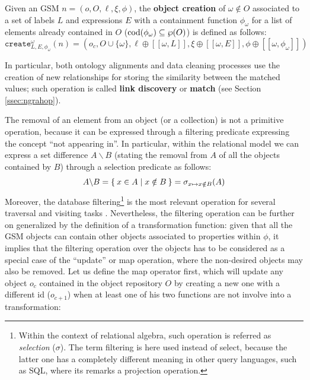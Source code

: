 \begin{definition}\label{gsql:objcreate}
	Given an GSM $n=(o,O,\ell,\xi,\phi)$,  the \textbf{object creation} of $\omega\notin O$ associated to a set of labels $L$ and expressions $E$ with a containment function $\phi_\omega$ for a list of elements already contained in $O$ ($\operatorname{cod}(\phi_\omega)\subseteq \wp(O)$) is defined as follows:
	\[\texttt{create}^\omega_{L,E,\phi_\omega}(n)=(o_c,O\cup\{\omega\},\ell\oplus[[\omega, L]],\xi\oplus[[\omega, E]],\phi\oplus[[\omega,\phi_\omega]])\]
\end{definition}

 In particular, both ontology alignments and data cleaning processes \cite{ALIEH17} use the creation of new relationships for storing the similarity between the matched values; such operation is called \textbf{link discovery} or \textbf{match} (see Section \vref{ssec:ngrahop}).

The removal of an element from an object (or a collection) is not a primitive operation, because it can be expressed through a filtering predicate expressing the concept ``not appearing in''. In particular, within the relational model we can express a set difference $A\backslash B$ (stating the removal from $A$ of all the objects contained by $B$) through a selection predicate as follows:
\begin{equation}\label{eq:difference}
A\backslash B = \Set{x\in A | x\notin B}=\sigma_{x\mapsto x\notin B}(A)
\end{equation}
Moreover, the  database filtering\footnote{Within the context of relational algebra, such operation is referred as \textit{selection} ($\sigma$). The term filtering is here used instead of select, because the latter one has a completely different meaning in other query languages, such as SQL, where its remarks a projection operation.} is the most relevant operation for several traversal and visiting tasks \cite{ThakkarPAV17,Neo4jAlg,MartonSV17,NautiLOD}. Nevertheless, the filtering operation can be further on generalized by the definition of a transformation function: given that all the GSM objects can contain  other objects associated to properties within $\phi$, it implies that the filtering operation over the objects has to be considered as a special case of the ``update'' or map operation, where the non-desired objects may also be removed.  Let us define the map operator first, which will update any object $o_c$ contained in the object repository $O$ by creating a new one with a different id ($o_{c+1}$) when at least one of his two functions are not involve into a transformation:

